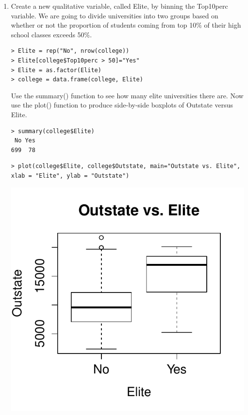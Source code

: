 \documentclass[11pt]{article}
\providecommand{\code}[1]{{\color{red}\ttfamily #1}}
\begin{document}
\begin{enumerate}
\begin{enumerate}
\begin{enumerate}
\item Create a new qualitative variable, called \code{Elite}, by binning the \code{Top10perc} variable.  We are going to divide universities into two groups based on whether or not the proportion of students coming from top 10\% of their high school classes exceeds 50\%.

\begin{lstlisting}
> Elite = rep("No", nrow(college))
> Elite[college$Top10perc > 50]="Yes"
> Elite = as.factor(Elite)
> college = data.frame(college, Elite)
\end{lstlisting}

Use the \code{summary()} function to see how many elite universities there are.  Now use the \code{plot()} function to produce side-by-side boxplots of \code{Outstate} versus \code{Elite}.

\begin{lstlisting}
> summary(college$Elite)
 No Yes 
699  78 
\end{lstlisting}

\begin{lstlisting}
> plot(college$Elite, college$Outstate, main="Outstate vs. Elite", xlab = "Elite", ylab = "Outstate")
\end{lstlisting}
\begin{center}
\includegraphics{plot2.pdf}
\end{center}


\end{enumerate}
\end{enumerate}
\end{enumerate}
\end{document}
